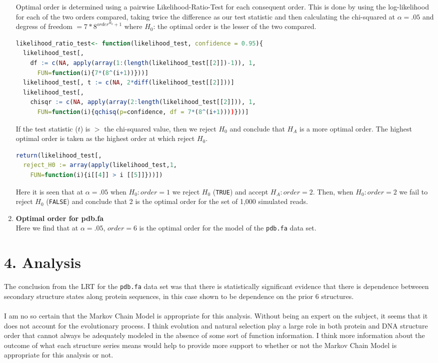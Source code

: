 \documentclass[12pt]{article}
\begin{document}
\begin{enumerate}[label = \textbf{\alph*.}]
    Optimal order is determined using a pairwise Likelihood-Ratio-Test for each consequent order. This is done by using the log-likelihood for each of the two orders compared, taking twice the difference as our test statistic and then calculating the chi-squared at $\alpha = .05$ and degress of freedom $= 7*8^{order^{H_{0}}+1}$ where $H_0$: the optimal order is the lesser of the two compared.
    \begin{lstlisting}[language=R]
likelihood_ratio_test<- function(likelihood_test, confidence = 0.95){
  likelihood_test[, 
    df := c(NA, apply(array(1:(length(likelihood_test[[2]])-1)), 1, 
      FUN=function(i){7*(8^(i+1))}))]
  likelihood_test[, t := c(NA, 2*diff(likelihood_test[[2]]))]
  likelihood_test[, 
    chisqr := c(NA, apply(array(2:length(likelihood_test[[2]])), 1, 
      FUN=function(i){qchisq(p=confidence, df = 7*(8^(i+1))))}))]
    \end{lstlisting}
    If the test statistic ($t$) is $>$ the chi-squared value, then we reject $H_0$ and conclude that $H_A$ is a more optimal order. The highest optimal order is taken as the highest order at which reject $H_0$.
    \begin{lstlisting}[language=R]
return(likelihood_test[, 
  reject_H0 := array(apply(likelihood_test,1,
    FUN=function(i){i[[4]] > i [[5]]}))])
    \end{lstlisting}
    
    Here it is seen that at $\alpha = .05$ when $H_0: order = 1$ we reject $H_0$ (\texttt{TRUE}) and accept $H_A: order = 2$. Then, when $H_0: order = 2$ we fail to reject $H_0$ (\texttt{FALSE}) and conclude that 2 is the optimal order for the set of 1,000 simulated reads.
  \item \textbf{Optimal order for pdb.fa}\\
    
    Here we find that at $\alpha = .05$, $order = 6$ is the optimal order for the model of the \texttt{pdb.fa} data set.
\end{enumerate}

\newpage
\section*{4. Analysis}

      The conclusion from the LRT for the \texttt{pdb.fa} data set was that there is statistically significant evidence that there is dependence betweeen secondary structure states along protein sequences, in this case shown to be dependence on the prior 6 structures. \\\\
      I am no so certain that the Markov Chain Model is appropriate for this analysis. Without being an expert on the subject, it seems that it does not account for the evolutionary process. I think evolution and natural selection play a large role in both protein and DNA structure order that cannot always be adequately modeled in the absence of some sort of function information. I think more information about the outcome of what each structure series means would help to provide more support to whether or not the Markov Chain Model is appropriate for this analysis or not.
\end{document}
